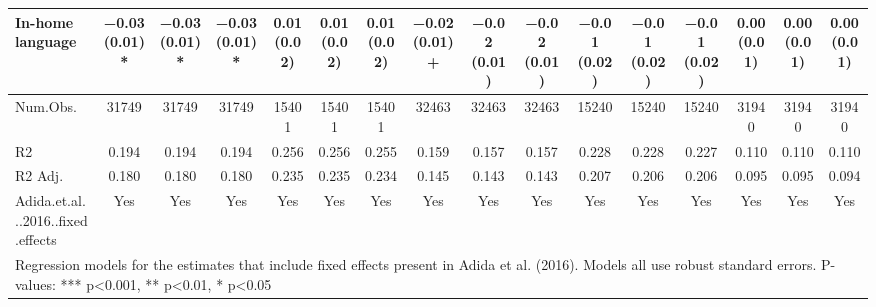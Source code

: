 \begin{table}
\begin{tabular}[t]{lccccccccccccccc}
In-home language & \num{-0.03} (\num{0.01})* & \num{-0.03} (\num{0.01})* & \num{-0.03} (\num{0.01})* & \num{0.01} (\num{0.02}) & \num{0.01} (\num{0.02}) & \num{0.01} (\num{0.02}) & \num{-0.02} (\num{0.01})+ & \num{-0.02} (\num{0.01}) & \num{-0.02} (\num{0.01}) & \num{-0.01} (\num{0.02}) & \num{-0.01} (\num{0.02}) & \num{-0.01} (\num{0.02}) & \num{0.00} (\num{0.01}) & \num{0.00} (\num{0.01}) & \num{0.00} (\num{0.01})\\
\midrule
Num.Obs. & \num{31749} & \num{31749} & \num{31749} & \num{15401} & \num{15401} & \num{15401} & \num{32463} & \num{32463} & \num{32463} & \num{15240} & \num{15240} & \num{15240} & \num{31940} & \num{31940} & \num{31940}\\
R2 & \num{0.194} & \num{0.194} & \num{0.194} & \num{0.256} & \num{0.256} & \num{0.255} & \num{0.159} & \num{0.157} & \num{0.157} & \num{0.228} & \num{0.228} & \num{0.227} & \num{0.110} & \num{0.110} & \num{0.110}\\
R2 Adj. & \num{0.180} & \num{0.180} & \num{0.180} & \num{0.235} & \num{0.235} & \num{0.234} & \num{0.145} & \num{0.143} & \num{0.143} & \num{0.207} & \num{0.206} & \num{0.206} & \num{0.095} & \num{0.095} & \num{0.094}\\
Adida.et.al...2016..fixed.effects & Yes & Yes & Yes & Yes & Yes & Yes & Yes & Yes & Yes & Yes & Yes & Yes & Yes & Yes & Yes\\
\bottomrule
\multicolumn{16}{l}{\rule{0pt}{1em}Regression models for the estimates that include fixed effects present in Adida et al. (2016). Models all use robust standard errors. P-values: *** p<0.001, ** p<0.01, * p<0.05}\\
\end{tabular}
\end{table}
